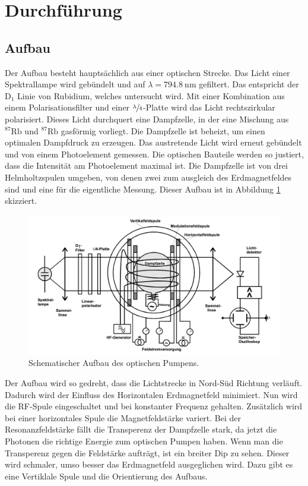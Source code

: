 \section{Durchführung}
\subsection{Aufbau}
\label{sec:Durchführung}
Der Aufbau besteht hauptsächlich aus einer optischen Strecke. Das Licht einer Spektrallampe wird gebündelt und auf $\lambda = \SI{794,8}{\nano \meter}$
gefiltert. Das entspricht der $\mathrm{D}_1$ Linie von Rubidium, welches untersucht wird. Mit einer Kombination aus einem Polarisationsfilter und einer
$\sfrac{\lambda}{4}$-Platte wird das Licht rechtszirkular polarisiert. Dieses Licht durchquert eine Dampfzelle, in der eine Mischung aus ${}^87\mathrm{Rb}$
und ${}^87\mathrm{Rb}$ gasförmig vorliegt. Die Dampfzelle ist beheizt, um einen optimalen Dampfdruck zu erzeugen. Das austretende Licht wird erneut gebündelt
und von einem Photoelement gemessen. Die optischen Bauteile werden so justiert, dass die Intensität am Photoelement maximal ist. Die Dampfzelle ist von drei Helmholtzspulen umgeben, von denen zwei zum ausgleich des Erdmagnetfeldes sind und eine für
die eigentliche Messung. Dieser Aufbau ist in Abbildung \ref{fig:aufbaucom} skizziert.
\begin{figure}
	\centering
	\includegraphics[width=0.8\linewidth]{img/aufbaucom.jpg}
	\caption{Schematischer Aufbau des optischen Pumpens.\cite{V21}}
	\label{fig:aufbaucom}
\end{figure}
Der Aufbau wird so gedreht, dass die Lichtstrecke in Nord-Süd Richtung verläuft. Dadurch wird der Einfluss des Horizontalen Erdmagnetfeld minimiert.
Nun wird die RF-Spule eingeschaltet und bei konstanter Frequenz gehalten. Zusätzlich wird bei einer horizontales Spule die Magnetfeldstärke variert. Bei der
Resonanzfeldstärke fällt die Transperenz der Dampfzelle stark, da jetzt die Photonen die richtige Energie zum optischen Pumpen haben. Wenn man die Transperenz
gegen die Feldstärke aufträgt, ist ein breiter Dip zu sehen. Dieser wird schmaler, umso besser das Erdmagnetfeld ausgeglichen wird. Dazu gibt es eine
Vertiklale Spule und die Orientierung des Aufbaus.
